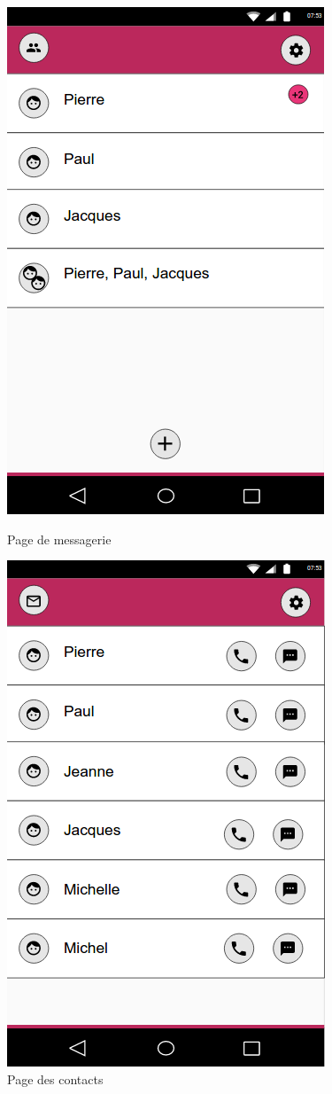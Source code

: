 \begin{figure}[H]
   \begin{minipage}[c]{.46\linewidth}
		\centering \includegraphics[scale=0.5]{img/Messagerie.png}
		\caption{Page de messagerie}
   \end{minipage} \hfill
   \begin{minipage}[c]{.46\linewidth}
		\centering \includegraphics[scale=0.5]{img/Contacts.png}
		\caption{Page des contacts}
   \end{minipage}
\end{figure}

